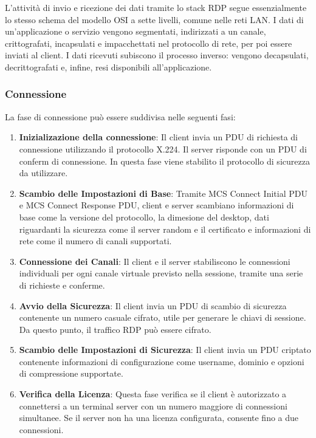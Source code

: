 \documentclass[12pt,a4paper,openright,twoside]{book}
\begin{document}
L'attività di invio e ricezione dei dati tramite lo stack RDP segue essenzialmente lo stesso schema del modello OSI a sette livelli, comune nelle reti LAN. I dati di un'applicazione o servizio vengono segmentati, indirizzati a un canale, crittografati, incapsulati e impacchettati nel protocollo di rete, per poi essere inviati al client. I dati ricevuti subiscono il processo inverso: vengono decapsulati, decrittografati e, infine, resi disponibili all'applicazione. \cite{microsoftRDP}

\subsubsection{Connessione}

La fase di connessione può essere suddivisa nelle seguenti fasi:
\begin{enumerate}
    \item \textbf{Inizializazione della connessione}: Il client invia un PDU di richiesta di connessione utilizzando il protocollo X.224. Il server risponde con un PDU di conferm di connessione. In questa fase viene stabilito il protocollo di sicurezza da utilizzare.
    \item \textbf{Scambio delle Impostazioni di Base}: Tramite MCS Connect Initial PDU e MCS Connect Response PDU, client e server scambiano informazioni di base come la versione del protocollo, la dimesione del desktop, dati riguardanti la sicurezza come il server random e il certificato e informazioni di rete come il numero di canali supportati.
    \item \textbf{Connessione dei Canali}: Il client e il server stabiliscono le connessioni individuali per ogni canale virtuale previsto nella sessione, tramite una serie di richieste e conferme.
    \item \textbf{Avvio della Sicurezza}: Il client invia un PDU di scambio di sicurezza contenente un numero casuale cifrato, utile per generare le chiavi di sessione. Da questo punto, il traffico RDP può essere cifrato.
    \item \textbf{Scambio delle Impostazioni di Sicurezza}: Il client invia un PDU criptato contenente informazioni di configurazione come username, dominio e opzioni di compressione supportate.
    \item \textbf{Verifica della Licenza}: Questa fase verifica se il client è autorizzato a connettersi a un terminal server con un numero maggiore di connessioni simultanee. Se il server non ha una licenza configurata, consente fino a due connessioni.

\end{enumerate}
\end{document}
